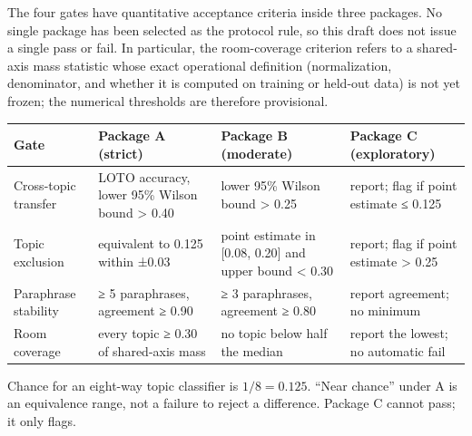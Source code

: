 \documentclass[11pt,a4paper]{article}
\begin{document}
The four gates have quantitative acceptance criteria inside three
packages. No single package has been selected as the protocol rule, so
this draft does not issue a single pass or fail. In particular, the
room-coverage criterion refers to a shared-axis mass statistic whose
exact operational definition (normalization, denominator, and whether it
is computed on training or held-out data) is not yet frozen; the
numerical thresholds are therefore provisional.

{\def\LTcaptype{none} %
\begin{longtable}[]{@{}
  >{\raggedright\arraybackslash}p{}
  >{\raggedright\arraybackslash}p{}
  >{\raggedright\arraybackslash}p{}
  >{\raggedright\arraybackslash}p{}@{}}
\toprule\noalign{}
\begin{minipage}[b]{\linewidth}\raggedright
Gate
\end{minipage} & \begin{minipage}[b]{\linewidth}\raggedright
Package A (strict)
\end{minipage} & \begin{minipage}[b]{\linewidth}\raggedright
Package B (moderate)
\end{minipage} & \begin{minipage}[b]{\linewidth}\raggedright
Package C (exploratory)
\end{minipage} \\
\midrule\noalign{}
\endhead
\bottomrule\noalign{}
\endlastfoot
Cross-topic transfer & LOTO accuracy, lower 95\% Wilson bound
\textgreater{} 0.40 & lower 95\% Wilson bound \textgreater{} 0.25 &
report; flag if point estimate ≤ 0.125 \\
Topic exclusion & equivalent to 0.125 within ±0.03 & point estimate in
{[}0.08, 0.20{]} and upper bound \textless{} 0.30 & report; flag if
point estimate \textgreater{} 0.25 \\
Paraphrase stability & ≥ 5 paraphrases, agreement ≥ 0.90 & ≥ 3
paraphrases, agreement ≥ 0.80 & report agreement; no minimum \\
Room coverage & every topic ≥ 0.30 of shared-axis mass & no topic below
half the median & report the lowest; no automatic fail \\
\end{longtable}
}

Chance for an eight-way topic classifier is \(1/8 = 0.125\). ``Near
chance'' under A is an equivalence range, not a failure to reject a
difference. Package C cannot pass; it only flags.
\end{document}
